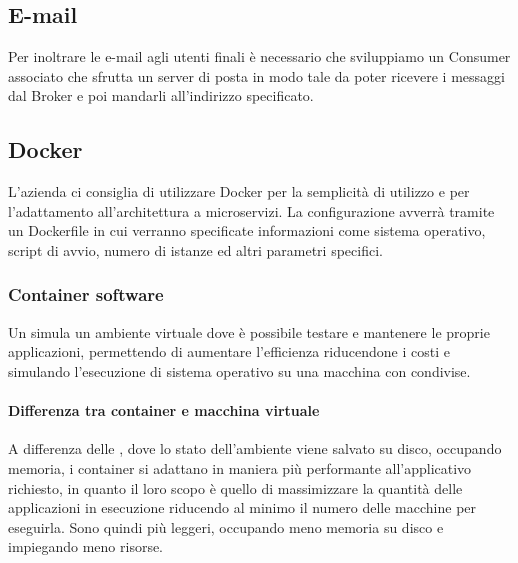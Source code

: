 		\subsection{E-mail}
		Per inoltrare le e-mail agli utenti finali è necessario che sviluppiamo un Consumer associato che sfrutta un server di posta
        in modo tale da poter ricevere i messaggi dal Broker e poi mandarli all'indirizzo specificato.
		
		\subsection{Docker}
		L'azienda ci consiglia di utilizzare Docker per la semplicità di utilizzo e per l'adattamento all'architettura a microservizi.
		La configurazione avverrà tramite un Dockerfile in cui verranno specificate informazioni come sistema operativo, script di avvio,
        numero di istanze ed altri parametri specifici.
        
        \subsubsection{Container software}\label{TecnologieContainer}
        
        Un  simula un ambiente virtuale dove è possibile testare e mantenere le proprie applicazioni, permettendo di aumentare l'efficienza riducendone i costi e simulando l'esecuzione di sistema operativo su una macchina con  condivise.
        
        \paragraph{Differenza tra container e macchina virtuale}
        A differenza delle , dove lo stato dell'ambiente viene salvato su disco, occupando memoria, i container si adattano in maniera più performante all'applicativo richiesto, in quanto il loro scopo è quello di massimizzare la quantità delle applicazioni in esecuzione riducendo al minimo il numero delle macchine per eseguirla.
        Sono quindi più leggeri, occupando meno memoria su disco e impiegando meno risorse.
        
			